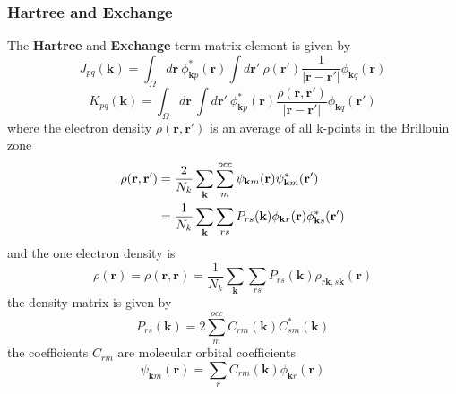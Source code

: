 \documentclass{article}
\begin{document}
        \subsubsection{Hartree and Exchange}
            The \textbf{Hartree} and \textbf{Exchange} term matrix element\cite{McClain2017} is given by
            \begin{equation}
                J_{pq}(\textbf{k}) = \int_{\Omega}d\textbf{r}\ \phi_{\textbf{k}p}^*(\textbf{r})
                \int d\textbf{r}'\ \rho(\textbf{r}')\frac{1}{\left|\textbf{r}-\textbf{r}'\right|}\phi_{\textbf{k}q}(\textbf{r})\label{hartree}
            \end{equation}
            \begin{equation}
                K_{pq}(\textbf{k}) = \int_{\Omega}d\textbf{r}\ \int d\textbf{r}'\ \phi_{\textbf{k}p}^*(\textbf{r})
                \frac{\rho(\textbf{r},\textbf{r}')}{\left|\textbf{r}-\textbf{r}'\right|}\phi_{\textbf{k}q}(\textbf{r}')\label{exchange}
            \end{equation}
            where the electron density $\rho(\textbf{r},\textbf{r}')$ is an average of all k-points in the Brillouin zone
            \begin{align}
                \rho(\textbf{r},\textbf{r}') &= \frac{2}{N_k}\sum_{\textbf{k}}\sum_m^{occ}\psi_{\textbf{k}m}(\textbf{r})\psi_{\textbf{k}m}^*(\textbf{r}')\notag\\
                &= \frac{1}{N_k}\sum_{\textbf{k}}\sum_{rs}P_{rs}(\textbf{k})\phi_{\textbf{k}r}(\textbf{r})
                    \phi_{\textbf{k}s}^*(\textbf{r}')
            \end{align}
            and the one electron density is
            \begin{equation}
                \rho(\textbf{r}) = \rho(\textbf{r},\textbf{r}) = \frac{1}{N_k}\sum_{\textbf{k}}\sum_{rs}
                P_{rs}(\textbf{k})\rho_{r\textbf{k},s\textbf{k}}(\textbf{r})
            \end{equation}
            the density matrix is given by
            \begin{equation}
                P_{rs}(\textbf{k}) = 2\sum_m^{occ}C_{rm}(\textbf{k})C_{sm}^*(\textbf{k})
            \end{equation}
            the coefficients $C_{rm}$ are molecular orbital coefficients
            \begin{equation}
                \psi_{\textbf{k}m}(\textbf{r}) = \sum_{r}C_{rm}(\textbf{k})\phi_{\textbf{k}r}(\textbf{r})
            \end{equation} 
\end{document}
